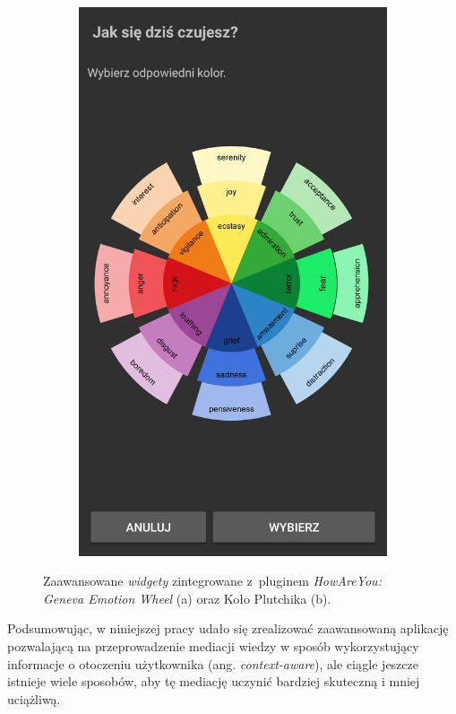 \begin{itemize}
\begin{figure}[H]
\begin{subfigure}{0.35\textwidth}
			\includegraphics[scale=0.22]{rozdzial6/jspsych-plutchik-wheel-2}
			\subcaption{\label{subfigure_b}}
		\end{subfigure}
		\caption{ Zaawansowane \textit{widgety} zintegrowane z~pluginem \textit{HowAreYou: } \textit{Geneva Emotion Wheel} (a) oraz Koło Plutchika (b).}
	\end{figure}
	
\end{itemize}

Podsumowując, w niniejszej pracy udało się zrealizować zaawansowaną aplikację pozwalającą na przeprowadzenie mediacji wiedzy w sposób wykorzystujący informacje o otoczeniu użytkownika (ang. \textit{context-aware}), ale ciągle jeszcze istnieje wiele sposobów, aby tę mediację uczynić bardziej skuteczną i mniej uciążliwą.